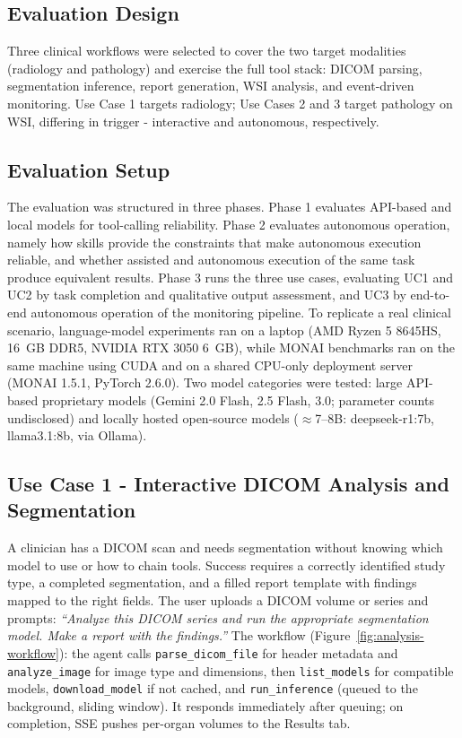 \documentclass[1p,12pt]{elsarticle}
\begin{document}
\subsection{Evaluation Design}
\label{sec:evaluation}

Three clinical workflows were selected to cover the two target modalities (radiology and pathology) and exercise the full tool stack: DICOM parsing, segmentation inference, report generation, WSI analysis, and event-driven monitoring. Use Case 1 targets radiology; Use Cases 2 and 3 target pathology on WSI, differing in trigger - interactive and autonomous, respectively.

\subsection{Evaluation Setup}
The evaluation was structured in three phases. Phase 1 evaluates API-based and local models for tool-calling reliability. Phase 2 evaluates autonomous operation, namely how skills provide the constraints that make autonomous execution reliable, and whether assisted and autonomous execution of the same task produce equivalent results. Phase 3 runs the three use cases, evaluating UC1 and UC2 by task completion and qualitative output assessment, and UC3 by end-to-end autonomous operation of the monitoring pipeline. To replicate a real clinical scenario, language-model experiments ran on a laptop (AMD Ryzen 5 8645HS, 16~GB DDR5, NVIDIA RTX 3050 6~GB), while MONAI benchmarks ran on the same machine using CUDA and on a shared CPU-only deployment server (MONAI 1.5.1, PyTorch 2.6.0). 
Two model categories were tested: large API-based proprietary models (Gemini 2.0 Flash, 2.5 Flash, 3.0; parameter counts undisclosed) and locally hosted open-source models ($\approx$7--8B: deepseek-r1:7b, llama3.1:8b, via Ollama).

\subsection{Use Case 1  -  Interactive DICOM Analysis and Segmentation}
A clinician has a DICOM scan and needs segmentation without knowing which model to use or how to chain tools. Success requires a correctly identified study type, a completed segmentation, and a filled report template with findings mapped to the right fields. The user uploads a DICOM volume or series and prompts: \textit{``Analyze this DICOM series and run the appropriate segmentation model. Make a report with the findings.''} The workflow (Figure~\ref{fig:analysis-workflow}): the agent calls \texttt{parse\_dicom\_file} for header metadata and \texttt{analyze\_image} for image type and dimensions, then \texttt{list\_models} for compatible models, \texttt{download\_model} if not cached, and \texttt{run\_inference} (queued to the background, sliding window). It responds immediately after queuing; on completion, SSE pushes per-organ volumes to the Results tab.
\end{document}
